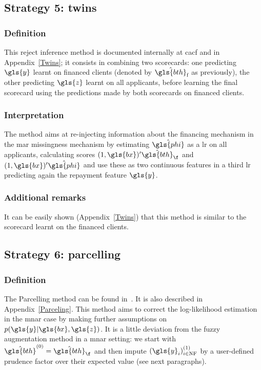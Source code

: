 \subsection{Strategy 5: twins}

\subsubsection{Definition}
This {reject inference} method is documented internally at \gls{cacf} and in Appendix~\ref{Twins}; it consists in combining two scorecards: one predicting $\gls{y}$ learnt on financed clients (denoted by $\hat{\gls{bth}}_{\text{f}}$ as previously), the other predicting $\gls{z}$ learnt on all applicants, before learning the final scorecard using the predictions made by both scorecards on financed clients.

\subsubsection{Interpretation}
The method aims at re-injecting information about the financing mechanism in the \gls{mar} missingness mechanism by estimating $\hat{\gls{phi}}$ as a \gls{lr} on all applicants, calculating \gls{score}s $(1,\gls{bx})' \hat{\gls{bth}}_\f$ and $(1,\gls{bx})' \hat{\gls{phi}}$ and use these as two continuous features in a third \gls{lr} predicting again the repayment feature $\gls{y}$.

\subsubsection{Additional remarks}
It can be easily shown (Appendix~\ref{Twins}) that
this method is similar to the scorecard learnt on the financed clients.

\subsection{Strategy 6: parcelling} \label{subsec:parcel}

\subsubsection{Definition}
The Parcelling method can be found in~\cite{saporta,banasik,RI6}. It is also described in Appendix~\ref{Parceling}. This method aims to correct the log-likelihood estimation in the \gls{mnar} case by making further assumptions on $p(\gls{y} | \gls{bx}, \gls{z})$. It is a little deviation from the fuzzy augmentation method in a \gls{mnar} setting: we start with $\hat{\gls{bth}}^{(0)} = \hat{\gls{bth}}_\f$ and then impute $(\gls{y}_i)_{i \in \text{NF}}^{(1)}$ by a user-defined prudence factor over their expected value (see next paragraphs).

